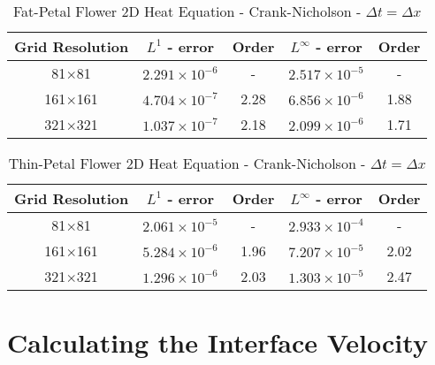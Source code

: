 \documentclass[oneside,12pt,final]{/Applications/TeX/packages/ucthesis-CA2012}
\begin{document}
\begin{mainmatter}
\begin{table} [!h]
\caption{Fat-Petal Flower 2D Heat Equation - Crank-Nicholson - $\Delta t = \Delta x$}
\centering
\begin{tabular}{c c c c c}
\hline
Grid Resolution & $L^1$ - error           & Order  & $L^{\infty}$ - error        & Order \\ \hline
81$\times$81     & $2.291 \times 10^{-6}$  &   -    & $2.517 \times 10^{-5}$   &  -  \\
161$\times$161   & $4.704 \times 10^{-7}$  &  2.28  & $6.856 \times 10^{-6}$   & 1.88\\
321$\times$321   & $1.037 \times 10^{-7}$ &  2.18  & $2.099 \times 10^{-6}$   & 1.71\\
\end{tabular}
\end{table}

\begin{table} [!h]
\caption{Thin-Petal Flower 2D Heat Equation - Crank-Nicholson - $\Delta t = \Delta x$}\label{table:Flower_Crank}
\centering
\begin{tabular}{c c c c c}
\hline
Grid Resolution & $L^1$ - error           & Order  & $L^{\infty}$ - error        & Order \\ \hline
81$\times$81     & $2.061 \times 10^{-5}$  &   -    & $2.933 \times 10^{-4}$   &  -    \\
161$\times$161   & $5.284 \times 10^{-6}$  &  1.96  & $7.207 \times 10^{-5}$   & 2.02  \\
321$\times$321   & $1.296 \times 10^{-6}$ &  2.03  & $1.303 \times 10^{-5}$   & 2.47  \\
\end{tabular}
\end{table}

\chapter{Calculating the Interface Velocity} \label{section:Interface_Velocity}


\end{mainmatter}
\end{document}
